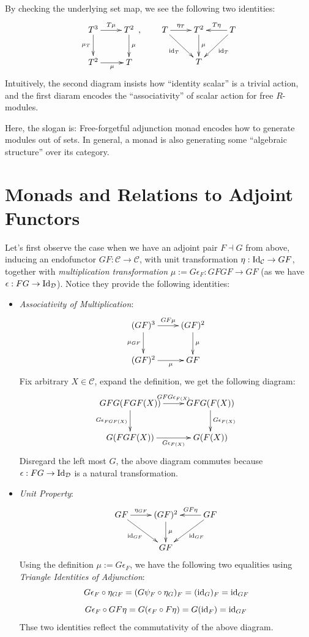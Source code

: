 \documentclass{article}
\begin{document}
By checking the underlying set map, we see the following two identities:
\[\xymatrix{
        T^3 \ar[d]_-{\mu_{T}} \ar[r]^-{T\mu} & T^2\ar[d]^-{\mu}\\
        T^2 \ar[r]_-{\mu} & T
    },\quad\quad \xymatrix{
        T \ar[dr]_-{\id_{T}} \ar[r]^-{\eta_{T}} & T^2 \ar[d]^-{\mu} & T \ar[l]_-{T\eta} \ar[dl]^-{\id_{T}}\\
        & T
    }\]
Intuitively, the second diagram insists how ``identity scalar'' is a trivial action, and the first diaram encodes the ``associativity'' of scalar action for free $R$-modules.

Here, the slogan is: Free-forgetful adjunction monad encodes how to generate modules out of sets. In general, a monad is also generating some ``algebraic structure'' over its category.

\newpage

\section{Monads and Relations to Adjoint Functors}

Let's first observe the case when we have an adjoint pair $F\dashv G$ from above, inducing an endofunctor $GF:\mathcal{C}\rightarrow\mathcal{C}$, with unit transformation $\eta:\mathrm{Id}_\mathcal{C}\rightarrow GF$, together with \emph{multiplication transformation} $\mu:=G\epsilon_F:GFGF\rightarrow GF$ (as we have $\epsilon:FG\rightarrow\mathrm{Id}_\mathcal{D}$). Notice they provide the following identities:
\begin{itemize}
    \item \emph{Associativity of Multiplication}:
    \[\xymatrix{
        (GF)^3 \ar[d]_-{\mu_{GF}} \ar[r]^-{GF\mu} & (GF)^2\ar[d]^-{\mu}\\
        (GF)^2 \ar[r]_-{\mu} & GF
    }\]
    Fix arbitrary $X\in\mathcal{C}$, expand the definition, we get the following diagram:
    \[\xymatrix{
        GFG(FGF(X)) \ar[d]_-{G\epsilon_{FGF(X)}} \ar[r]^-{GFG\epsilon_{F(X)}} & GFG(F(X)) \ar[d]^-{G\epsilon_{F(X)}}\\
        G(FGF(X)) \ar[r]_-{G\epsilon_{F(X)}} & G(F(X))
    }\]
    Disregard the left most $G$, the above diagram commutes because $\epsilon:FG\rightarrow\mathrm{Id}_\mathcal{D}$ is a natural transformation.

    \item \emph{Unit Property}:
    \[\xymatrix{
        GF \ar[dr]_-{\id_{GF}} \ar[r]^-{\eta_{GF}} & (GF)^2 \ar[d]^-{\mu} & GF \ar[l]_-{GF\eta} \ar[dl]^-{\id_{GF}}\\
        & GF
    }\]
    Using the definition $\mu:= G\epsilon_F$, we have the following two equalities using \emph{Triangle Identities of Adjunction}:
    \[G\epsilon_F \circ \eta_{GF} = (G\psi_F\circ \eta_G)_F = (\mathrm{id}_G)_F = \mathrm{id}_{GF}\]
    \[G\epsilon_F\circ GF\eta = G(\epsilon_F \circ F\eta) = G(\mathrm{id}_F) = \mathrm{id}_{GF} \]
    Thse two identities reflect the commutativity of the above diagram.
\end{itemize}
\end{document}
